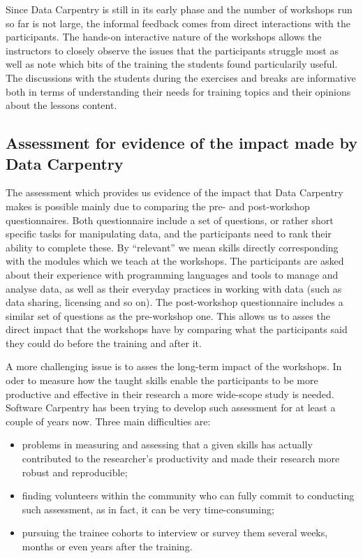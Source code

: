 \documentclass[15]{idcc}
\begin{document}
\begin{itemize}
Since Data Carpentry is still in its early phase and the number of workshops run so far is not large, the informal feedback comes from direct interactions with the participants.
The hands-on interactive nature of the workshops allows the instructors to closely observe the issues that the participants struggle most as well as note which bits of the training the students
found particularily useful. The discussions with the students during the exercises and breaks are informative both in terms of understanding
their needs for training topics and their opinions about the lessons content.



\subsection{Assessment for evidence of the impact made by Data Carpentry}

The assessment which provides us evidence of the impact that Data Carpentry makes is possible mainly due to comparing the pre- and post-workshop questionnaires.
 Both questionnaire include a set of questions, or rather short specific tasks for manipulating data, and the participants need to rank their ability to complete these.
By ``relevant'' we mean skills directly corresponding with the modules which we teach at the workshops. The
participants are asked about their experience with programming languages and tools to manage and analyse data, as well as their everyday practices
in working with data (such as data sharing, licensing and so on). The post-workshop questionnaire includes a similar set of questions as the
pre-workshop one. This allows us to asses the direct impact that the workshops
have by comparing what the participants said they could do before the training and after it.

A more challenging issue is to asses the long-term impact of the workshops. In oder to measure how the taught skills enable the participants to
be more productive and effective in their research a more wide-scope study is needed. Software Carpentry has been trying to develop such assessment
for at least a couple of years now. Three main difficulties are:
\begin{itemize}
\item problems in measuring and assessing that a given skills has actually contributed to the researcher's productivity and made their research more robust and reproducible;
\item finding volunteers within the community who can fully commit to conducting such assessment, as in fact, it can be very time-consuming;
\item pursuing the trainee cohorts to interview or survey them several weeks, months or even years after the training.
\end{itemize}


\end{itemize}
\end{document}

